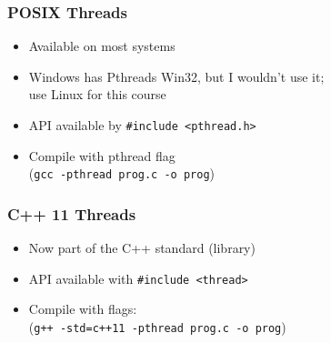 \documentclass[aspectratio=43]{beamer}
\newenvironment{changemargin}[1]{%
  \begin{list}{}{%
    \setlength{\topsep}{0pt}%
    \setlength{\leftmargin}{#1}%
    \setlength{\rightmargin}{1em}
    \setlength{\listparindent}{\parindent}%
    \setlength{\itemindent}{\parindent}%
    \setlength{\parsep}{\parskip}%
  }%
  \item[]}{\end{list}}
\begin{document}
\begin{frame}
  \frametitle{POSIX Threads}

  \begin{changemargin}{1.5cm}
  \begin{itemize}
    \item Available on most systems
    \vfill
    \item Windows has Pthreads Win32, but I wouldn't use it; \\use Linux for
          this course
    \vfill
    \item API available by {\tt \#include <pthread.h>}
    \vfill
    \item Compile with pthread flag \\ ({\tt gcc -pthread prog.c -o prog})
  \end{itemize}
  \end{changemargin}
\end{frame}


\begin{frame}[fragile]
  \frametitle{C++ 11 Threads}

  \begin{changemargin}{1.5cm}
  \begin{itemize}
    \item Now part of the C++ standard (library)
    \vfill
    \item API available with {\tt \#include <thread>}
    \vfill
    \item Compile with flags: \\ (\verb!g++ -std=c++11 -pthread prog.c -o prog!)
  \end{itemize}
  \end{changemargin}
\end{frame}
\end{document}
